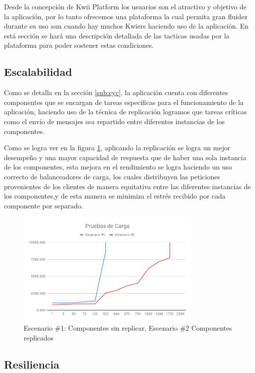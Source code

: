 Desde la concepción de Kwii Platform los usuarios son el atractivo y objetivo de la aplicación, por lo tanto ofrecemos una plataforma la cual permita gran fluidez durante su uso aun cuando hay muchos Kwiers haciendo uso de la aplicación. En está sección se hará una descripción detallada de las tacticas usadas por la plataforma para poder sostener estas condiciones.

\subsection{Escalabilidad}

Como se detalla en la sección \ref{sub:cyc}, la aplicación cuenta con diferentes componentes que se encargan de tareas especificas para el funcionamiento de la aplicación, haciendo uso de la técnica de replicación logramos que tareas críticas como el envío de mensajes sea repartido entre diferentes instancias de los componentes.

\noindent Como se logra ver en la figura \ref{fig:stressTest}, aplicando la replicación se logra un mejor desempeño y una mayor capacidad de respuesta que de haber una sola instancia de los componentes, esta mejora en el rendimiento se logra haciendo un uso correcto de balanceadores de carga, los cuales distribuyen las peticiones provenientes de los clientes de manera equitativa entre las diferentes instancias de los componentes,y de esta manera se minimiza el estrés recibido por cada componente por separado.

\begin{figure}[h]
    \centering
    \includegraphics[width=9cm]{Figures/P5/stressTest.png}
    \caption{Escenario \#1: Componentes sin replicar, Escenario \#2 Componentes replicados}
    \label{fig:stressTest}
\end{figure}

\subsection{Resiliencia}

